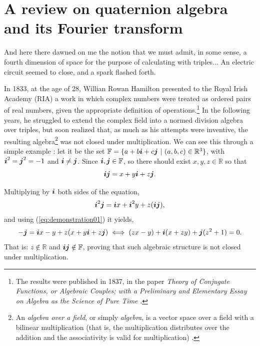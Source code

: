 \chapter{A review on quaternion algebra and its Fourier transform}
\label{ch:reviewQuat}

\begin{openingquote}
    And here there dawned on me the notion that we must admit, in some sense, a fourth dimension of space for the purpose of calculating with triples... An electric circuit seemed to close, and a spark flashed forth.
    \cite[quoting directly Sir William Hamilton]{van1976hamilton}
\end{openingquote}


In 1833, at the age of 28, Willian Rowan Hamilton presented to the Royal Irish Academy (RIA) a work in which complex numbers were treated as ordered pairs of real numbers, given the appropriate definition of operations.\footnote{The results were published in 1837, in the paper \emph{Theory of Conjugate Functions, or Algebraic Couples; with a Preliminary and Elementary Essay on Algebra as the Science of Pure Time} \cite{hamilton1837theory}.} In the following years, he struggled to extend the complex field into a normed division algebra over triples, but soon realized that, as much as his attempts were inventive, the resulting algebra\footnote{An \textit{algebra over a field}, or simply \textit{algebra}, is a vector space over a field with a bilinear multiplication (that is, the multiplication distributes over the addition and the associativity is valid for multiplication) \cite{schafer1955introduction}.} was not closed under multiplication. We can see this through a simple example \cite{santos2011algebra}: let it be the set $\mathbb{F} = \{ a + b \boldsymbol{i} + c \boldsymbol{j}  \ | \ (a, b, c) \in \mathbb{R}^3\}$, with $\boldsymbol{i}^2 = \boldsymbol{j}^2 = -1$ and $\boldsymbol{i} \neq \boldsymbol{j}$. Since $\boldsymbol{i}, \boldsymbol{j} \in \mathbb{F}$, so there should exist $x, y, z \in \mathbb{R}$ so that
\begin{equation}
    \boldsymbol{i} \boldsymbol{j} = x + y \boldsymbol{i} + z \boldsymbol{j}.
    \label{eq:demonstration01}
\end{equation}

Multiplying by $\boldsymbol{i}$ both sides of the equation,
\begin{equation}
    \boldsymbol{i}^2 \boldsymbol{j} = \boldsymbol{i} x + \boldsymbol{i}^2 y + z (\boldsymbol{i} \boldsymbol{j}),
\end{equation}
and using (\ref{eq:demonstration01}) it yields,
\begin{equation}
    - \boldsymbol{j} = \boldsymbol{i} x - y + z (x + y \boldsymbol{i} + z \boldsymbol{j})
    \iff
    (zx - y) + \boldsymbol{i} (x + zy) + \boldsymbol{j} (z^2 + 1) = 0.
\end{equation}
That is: $z \notin \mathbb{R}$ and $ \boldsymbol{i} \boldsymbol{j} \notin \mathbb{F} $, proving that such algebraic structure is not closed under multiplication.

